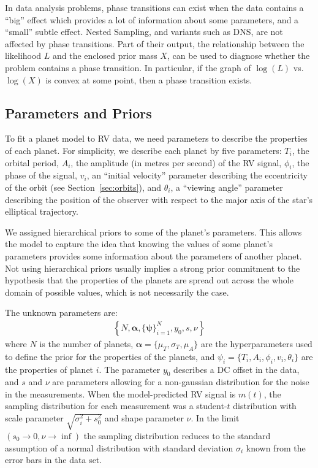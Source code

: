 \documentclass[useAMS,usenatbib]{mn2e}
\begin{document}
In data analysis problems, phase transitions can exist when the data contains
a ``big'' effect which provides a lot of information about some parameters, and
a ``small'' subtle effect.
Nested Sampling, and variants such as DNS, are not affected
by phase transitions. Part of their output, the relationship between the
likelihood $L$ and the enclosed prior mass $X$, can be used to diagnose whether the
problem contains a phase transition. In particular, if the graph of $\log(L)$
vs. $\log(X)$ is convex at some point, then a phase transition exists.

\subsection{Parameters and Priors}
To fit a planet model to RV data, we need parameters to describe
the properties of each planet. For simplicity, we describe each planet by
five parameters: $T_i$, the orbital period, $A_i$, the amplitude (in metres
per second) of the RV signal, $\phi_i$, the phase of the signal, $v_i$, an
``initial velocity'' parameter describing the eccentricity of the orbit
(see Section~\ref{sec:orbits}), and $\theta_i$, a ``viewing angle'' parameter
describing the position of the observer with respect to the major axis of the
star's elliptical trajectory.

We assigned hierarchical priors to some of the planet's parameters. This allows the
model to capture the idea that knowing the values of some planet's parameters
provides some information about the parameters of another planet. Not using
hierarchical priors usually implies a strong prior commitment to the hypothesis
that the properties of the planets are spread out across the whole domain of
possible values, which is not necessarily the case.

The unknown parameters are:
\begin{eqnarray}
\left\{N, \boldsymbol{\alpha}, \{\boldsymbol{\psi}\}_{i=1}^N, y_0, s, \nu\right\}
\end{eqnarray}
where $N$ is the number of planets,
$\boldsymbol{\alpha} = \{\mu_T, \sigma_T, \mu_A\}$ are the
hyperparameters used to define the prior for the properties of the planets,
and $\psi_i = \{T_i, A_i, \phi_i, v_i, \theta_i\}$
are the properties of planet $i$.
The parameter $y_0$ describes a DC offset in the data, and $s$ and $\nu$ are
parameters allowing for a non-gaussian distribution for the noise in the
measurements. When the model-predicted RV signal is $m(t)$, the sampling
distribution for each measurement was a student-$t$ distribution with
scale parameter $\sqrt{\sigma_i^2 + s_0^2}$ and shape parameter $\nu$. In the limit
$(s_0 \to 0, \nu \to \inf)$ the sampling distribution reduces to the standard
assumption of a normal distribution with standard deviation $\sigma_i$ known
from the error bars in the data set.
\end{document}
